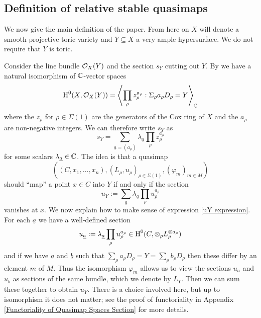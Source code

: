 \subsection{Definition of relative stable quasimaps} \label{Subsection relative stable quasimaps}

We now give the main definition of the paper. From here on $X$ will denote a smooth projective toric variety and $Y \subseteq X$ a very ample hypersurface. We do not require that $Y$ is toric.

Consider the line bundle $\mathcal{O}_X(Y)$ and the section $s_Y$ cutting out $Y$. By \cite{CoxRing} we have a natural isomorphism of $\mathbb{C}$-vector spaces
\begin{equation*} \operatorname{H}^0(X,\mathcal{O}_X(Y)) = \left\langle \prod_{\rho} z_\rho^{a_\rho} : \Sigma_\rho a_\rho D_\rho = Y \right\rangle_{\mathbb{C}} \end{equation*}
where the $z_\rho$ for $\rho \in \Sigma(1)$ are the generators of the Cox ring of $X$ and the $a_\rho$ are non-negative integers. We can therefore write $s_Y$ as
\begin{equation*} s_Y = \sum_{\underline{a}=(a_\rho)} \lambda_{\underline{a}} \prod_\rho z_\rho^{a_\rho} \end{equation*}
for some scalars $\lambda_{\underline{a}} \in \mathbb{C}$. The idea is that a quasimap
\begin{equation*} ((C,x_1,\ldots,x_n), (L_\rho,u_\rho)_{\rho \in \Sigma(1)}, (\varphi_m)_{m \in M}) \end{equation*}
should ``map'' a point $x \in C$ into $Y$ if and only if the section
\begin{equation} \label{uY expression} u_Y := \sum_{\underline{a}} \lambda_{\underline{a}} \prod_\rho u_\rho^{a_\rho} \end{equation}
vanishes at $x$. We now explain how to make sense of expression \eqref{uY expression}. For each $\underline{a}$ we have a well-defined section
\begin{equation*} u_{\underline{a}} := \lambda_{\underline{a}} \prod_\rho u_\rho^{a_\rho} \in \operatorname{H}^0(C,\otimes_\rho L_\rho^{\otimes a_\rho}) \end{equation*}
and if we have $\underline{a}$ and $\underline{b}$ such that $\sum_\rho a_\rho D_\rho = Y = \sum_\rho b_\rho D_\rho$ then these differ by an element $m$ of $M$. Thus the isomorphism $\varphi_m$ allows us to view the sections $u_{\underline{a}}$ and $u_{\underline{b}}$ as sections of the same bundle, which we denote by $L_Y$. Then we can sum these together to obtain $u_Y$. There is a choice involved here, but up to isomorphism it does not matter; see the proof of functoriality in Appendix \ref{Functoriality of Quasimap Spaces Section} for more details.

